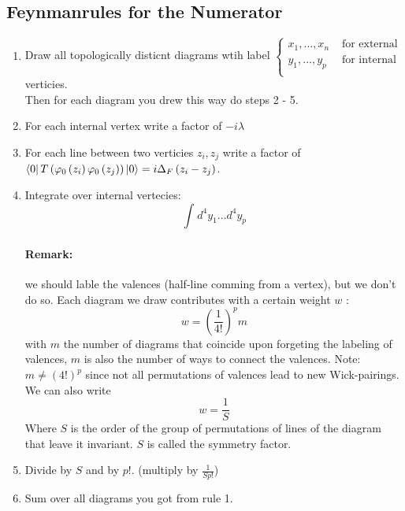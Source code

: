 \documentclass{report}
\begin{document}
\subsection{Feynmanrules for the Numerator}
\begin{enumerate}
  \item Draw all topologically disticnt diagrams wtih label $\begin{cases}
    x_1,\ldots,x_n & \text{ for external} \\
    y_1,\ldots,y_p & \text{ for internal} \\
  \end{cases}$ verticies. \\
  Then for each diagram you drew this way do steps 2 - 5.
  \item For each internal vertex write a factor of $-i \lambda$ 
  \item For each line between two verticies $z_i,z_j$ write a factor of $\bra{0} T\left( \varphi_0\left( z_i \right) \varphi_0\left( z_j \right)  \right) \ket{0} = i \Delta_F\left( z_i - z_j \right) $.
  \item Integrate over internal vertecies: \[
  \int_{}^{} d^{4} y_1\ldots d ^{4} y_p 
  \] 
  \paragraph{Remark:} we should lable the valences (half-line comming from a vertex), but we don't do so. Each diagram we draw contributes with a certain weight $w$ : \[
  w = \left( \frac{1}{4!}  \right) ^{p} m 
  \] with $m$ the number of diagrams that coincide upon forgeting the labeling of valences, $m$ is also the number of ways to connect the valences. Note: $m \neq \left( 4! \right) ^{p} $ since not all permutations of valences lead to new Wick-pairings.\\
  We can also write \[
  w = \frac{1}{S} 
  \] Where $S$ is the order of the group of permutations of lines of the diagram that leave it invariant. $S$ is called the symmetry factor.
  \item Divide by $S$ and by $p!$. (multiply by $\frac{1}{S p!} $)
  \item Sum over all diagrams you got from rule 1.
\end{enumerate}
\end{document}
